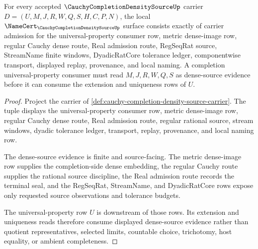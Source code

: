 \begin{theorem}
\label{thm:cauchy-completion-density-source-namecert-obligations}
For every accepted $\CauchyCompletionDensitySourceUp$ carrier $D=(U,M,J,R,W,Q,S,H,C,P,N)$, the local $\NameCert_{\CauchyCompletionDensitySourceUp}$ surface consists exactly of carrier admission for the universal-property consumer row, metric dense-image row, regular Cauchy dense route, Real admission route, RegSeqRat source, StreamName finite windows, DyadicRatCore tolerance ledger, componentwise transport, displayed replay, provenance, and local naming. A completion universal-property consumer must read $M,J,R,W,Q,S$ as dense-source evidence before it can consume the extension and uniqueness rows of $U$.
\end{theorem}
\begin{proof}
Project the carrier of \autoref{def:cauchy-completion-density-source-carrier}. The tuple displays the universal-property consumer row, metric dense-image row, regular Cauchy dense route, Real admission route, regular rational source, stream windows, dyadic tolerance ledger, transport, replay, provenance, and local naming row.

The dense-source evidence is finite and source-facing. The metric dense-image row supplies the completion-side dense embedding, the regular Cauchy route supplies the rational source discipline, the Real admission route records the terminal seal, and the RegSeqRat, StreamName, and DyadicRatCore rows expose only requested source observations and tolerance budgets.

The universal-property row $U$ is downstream of those rows. Its extension and uniqueness reads therefore consume displayed dense-source evidence rather than quotient representatives, selected limits, countable choice, trichotomy, host equality, or ambient completeness.
\end{proof}

